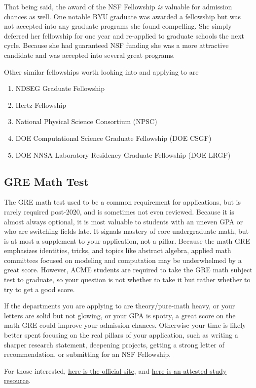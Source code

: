 \documentclass[11pt]{article}
\begin{document}
That being said, the award of the NSF Fellowship \emph{is} valuable for admission chances as well. One notable BYU graduate was awarded a fellowship but was not accepted into any graduate programs she found compelling. She simply deferred her fellowship for one year and re-applied to graduate schools the next cycle. Because she had guaranteed NSF funding she was a more attractive candidate and was accepted into several great programs.

Other similar fellowships worth looking into and applying to are 
\begin{enumerate}
    \item NDSEG Graduate Fellowship
    \item Hertz Fellowship
    \item National Physical Science Consortium (NPSC)
    \item DOE Computational Science Graduate Fellowship (DOE CSGF)
    \item DOE NNSA Laboratory Residency Graduate Fellowship (DOE LRGF)
\end{enumerate}

\subsection{GRE Math Test}
The GRE math test used to be a common requirement for applications, but is rarely required post-2020, and is sometimes not even reviewed. Because it is almost always optional, it is most valuable to students with an uneven GPA or who are switching fields late. It signals mastery of core undergraduate math, but is at most a supplement to your application, not a pillar. Because the math GRE emphasizes identities, tricks, and topics like abstract algebra, applied math committees focused on modeling and computation may be underwhelmed by a great score. However, ACME students are required to take the GRE math subject test to graduate, so your question is not whether to take it but rather whether to try to get a good score.

If the departments you are applying to are theory/pure-math heavy, or your letters are solid but not glowing, or your GPA is spotty, a great score on the math GRE could improve your admission chances. Otherwise your time is likely better spent focusing on the real pillars of your application, such as writing a sharper research statement, deepening projects, getting a strong letter of recommendation, or submitting for an NSF Fellowship.

For those interested, \href{https://www.ets.org/gre/test-takers/subject-tests/about.html}{here is the official site}, and \href{https://www.gregmat.com}{here is an attested study resource}.
\end{document}
